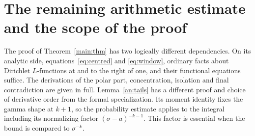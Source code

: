 \section{The remaining arithmetic estimate and the scope of the proof}\label{scope:account}

The proof of Theorem~\ref{main:thm} has two logically different dependencies. On its analytic side, equations~\eqref{eq:centred} and \eqref{eq:window}, ordinary facts about Dirichlet \(L\)-functions at and to the right of one, and their functional equations suffice. The derivations of the polar part, concentration, isolation and final contradiction are given in full. Lemma~\ref{an:tails} has a different proof and choice of derivative order from the formal specialization. Its moment identity fixes the gamma shape at \(k+1\), so the probability estimate applies to the integral including its normalizing factor \((\sigma-a)^{-k-1}\). This factor is essential when the bound is compared to \(\sigma^{-k}\).


